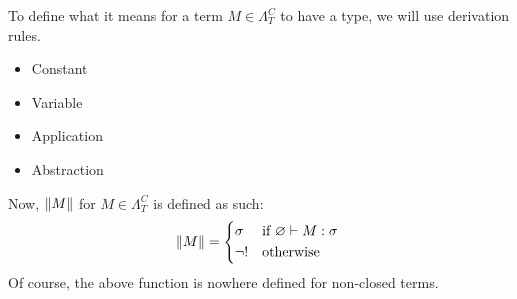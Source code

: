 \documentclass[main.tex]{subfiles}
\begin{document}
\begin{defn}
    To define what it means for a term $M \in \Lambda_T^C$ to have a type,
    we will use derivation rules.
    \begin{itemize}
        \item Constant
        \item Variable
        \item Application
        \item Abstraction
    \end{itemize}

    Now, $\|M\|$ for $M \in \Lambda_T^C$ is defined as such:
    \[
        \typeof{M} =
        \begin{cases*}
            \sigma & if $\varnothing \vdash M : \sigma$ \\
            \neg ! & otherwise
        \end{cases*}
    \]
    Of course, the above function is nowhere defined for non-closed terms.
\end{defn}
\end{document}
